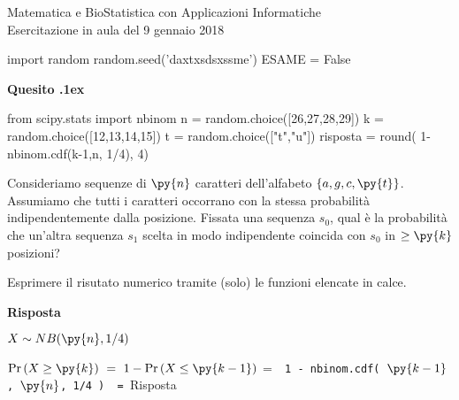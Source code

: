 \documentclass[11pt,twoside,a4paper]{article}
\newcounter{quesito}
\newenvironment{question}{\addtocounter{quesito}{1}\par\textbf{Quesito \thequesito.\kern1ex}}{\vspace{0.5\parskip}}
\newenvironment{answer}{\par\textbf{Risposta\quad}}{\vspace{\parskip}}
\begin{document}
\colorbox{blue!10}{\begin{minipage}{\textwidth}
Matematica e BioStatistica con Applicazioni Informatiche\\
Esercitazione in aula del 9 gennaio 2018
\end{minipage}}



\begin{pycode}
import random
random.seed('daxtxsdsxssme')
ESAME = False
\end{pycode}

\begin{question}
\begin{pycode}
from scipy.stats import nbinom
n = random.choice([26,27,28,29])
k = random.choice([12,13,14,15])
t = random.choice(["t","u"])
risposta = round( 1- nbinom.cdf(k-1,n, 1/4), 4)
\end{pycode}
Consideriamo sequenze di $\py{n}$ caratteri dell'alfabeto $\{a,g,c,\py{t}\}$. 
Assumiamo che tutti i caratteri occorrano con la stessa probabilità indipendentemente dalla posizione.
Fissata una sequenza $s_0$, qual è la probabilità che un'altra sequenza $s_1$ 
scelta in modo indipendente coincida con $s_0$ in $\ge\py{k}$ posizioni?   

Esprimere il risutato numerico tramite (solo) le funzioni elencate in calce.
\begin{answer}
    
  $X\sim NB(\py{n}, 1/4)$
  
  $\Pr(X\ge \py{k})\ =\ 1-\Pr(X\le \py{k-1})$
  \quad =\ 
  {\tt{\color{blue}  1 -  nbinom.cdf( $\py{k-1}$, $\py{n}$, 1/4 )}
  \ =\ 
  \py{risposta}}{\color{blue}\hfill Risposta}
\end{answer}
\end{question}
\end{document}
